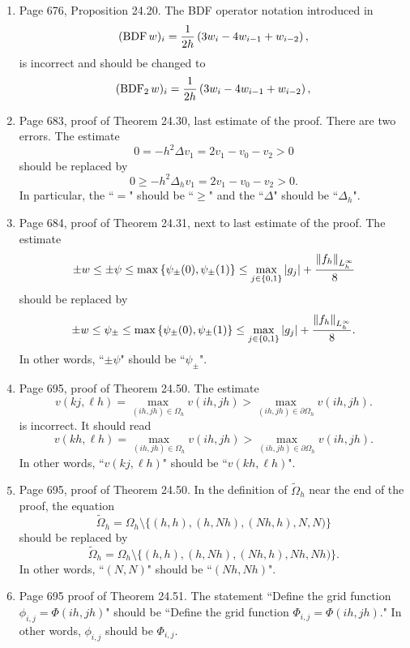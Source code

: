 \documentclass{book}
\begin{document}
	\begin{enumerate}
	
	\item
Page 676, Proposition 24.20. The BDF operator notation introduced in
  \[
(\operatorname{BDF} w )_i = \frac1{2h}\left( 3w_i - 4w_{i-1} + w_{i-2} \right),
  \]
is incorrect and  should be changed to
  \[
(\operatorname{BDF}_2 w )_i = \frac1{2h}\left( 3w_i - 4w_{i-1} + w_{i-2} \right),
  \]

	
	\item
Page 683, proof of Theorem 24.30, last estimate of the proof. There are two errors. The estimate
	\[
0 = - h^2 \Delta v_1 = 2v_1 - v_0 - v_2 > 0	
	\]
should be replaced by
	\[
0 \ge  - h^2 \Delta_h v_1 = 2v_1 - v_0 - v_2 > 0	.
	\]
In particular, the ``$=$" should be ``$\ge$" and the ``$\Delta$" should be ``$\Delta_h$".

	\item
Page 684, proof of Theorem 24.31, next to last estimate of the proof. The estimate
	\[
\pm w \le \pm \psi \le \max\left\{ \psi_\pm(0) , \psi_\pm(1) \right\} \le 	\max_{j\in \{0,1\}} |g_j| + \frac{\left\| f_h \right\|_{L_h^\infty}}{8}
	\]
should be replaced by
	\[
\pm w \le \psi_\pm  \le \max\left\{ \psi_\pm(0) , \psi_\pm(1) \right\} \le 	\max_{j\in \{0,1\}} |g_j| + \frac{\left\| f_h \right\|_{L_h^\infty}}{8}.
	\]
In other words, ``$\pm \psi$" should be ``$\psi_\pm$".


	\item
Page 695, proof of Theorem 24.50. The estimate
	\[
v(k j,\ell h) = \max_{(ih,jh)\in \Omega_h} v(ih,jh) > \max_{(ih,jh)\in \partial\Omega_h} v(ih,jh)	.
	\]
is incorrect. It should read
	\[
v(k h,\ell h) = \max_{(ih,jh)\in \Omega_h} v(ih,jh) > \max_{(ih,jh)\in \partial\Omega_h} v(ih,jh)	.
	\]
In other words, ``$v(k j,\ell h)$" should be ``$v(k h,\ell h)$".


	\item
Page 695, proof of Theorem 24.50. In the definition of $\tilde{\Omega}_h$ near the end of the proof, the equation
	\[
\tilde{\Omega}_h = \Omega_h\setminus \{(h,h),(h,Nh), (Nh,h), N,N) \}	
	\]
should be replaced by 
	\[
\tilde{\Omega}_h = \Omega_h\setminus \{(h,h),(h,Nh), (Nh,h), Nh,Nh) \}	.
	\]
In other words, ``$(N,N)$" should be ``$(Nh,Nh)$".
	
	\item
	
	
Page 695 proof of Theorem 24.51. The statement ``Define the grid function $\phi_{i,j} = \Phi(ih,jh)$" should be ``Define the grid function $\Phi_{i,j} = \Phi(ih,jh)$." In other words, $\phi_{i,j}$ should be $\Phi_{i,j}$.
	

\end{enumerate}
\end{document}
